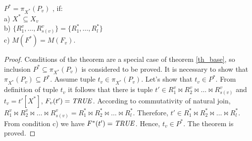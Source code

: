 \begin{theorem}
$P^{\ast} = \pi_{X^{\ast}} (P_{v})$
, if: 
\\a) $X^{\ast} \subseteq X_{v}$
\\b) 
$\{R^{v}_{1}, \ldots, R^{v}_{s(v)}\} = \{R^{\ast}_{1}, \ldots, R^{\ast}_{l}\}$
\\c) $M (F^{\ast}) = M (F_{v}) $.
\label{th_base_eq}
\end{theorem} 
\begin{proof}
Conditions of the theorem are a special case of theorem \ref{th_base}, so
inclusion $P^{\ast} \subseteq \pi_{X^{\ast}} (P_{v})$ is considered  to be
proved. It is necessary to show that $\pi_{X^{\ast}} (P_{v}) \subseteq
P^{\ast}$. Assume tuple $t_v \in \pi_{X^{\ast}} (P_{v})$. Let's show that $t_v
\in P^{\ast}$. From definition of tuple $t_v$ it follows that there is tuple
$t' \in R^v_1 \Join R^v_2\Join\ldots \Join R^v_{s(v)}$ and $t_v = t'[X^{\ast}]$,
$F_v(t')=\mathit{TRUE}$. According to commutativity of natural join, $R^v_1 \Join
R^v_2\Join\ldots \Join R^v_{s(v)} = R^{\ast}_1 \Join R^{\ast}_2\Join\ldots \Join
R^{\ast}_l$. Therefore, $t' \in R^{\ast}_1 \Join R^{\ast}_2\Join\ldots \Join
R^{\ast}_l$. From condition c) we have $F^{\ast} (t')=\mathit{TRUE}$. Hence, $t_v \in
P^{\ast}$. The theorem is proved.
\end{proof}
